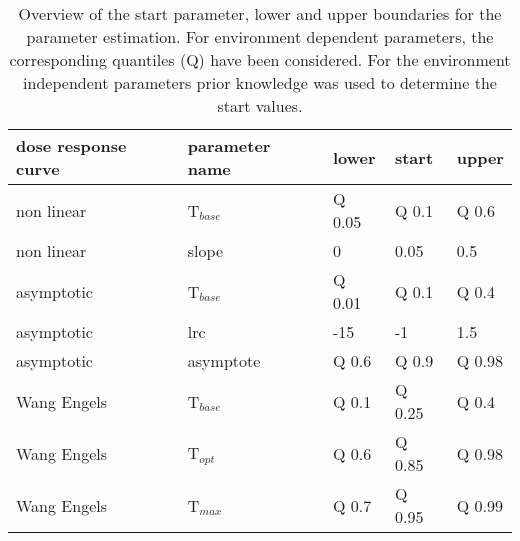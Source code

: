 \begin{table}[h]
\centering
\caption{Overview of the start parameter, lower and upper boundaries for the parameter estimation. For environment dependent parameters, the corresponding quantiles (Q) have been considered. For the environment independent parameters prior knowledge was used to determine the start values. }
\label{tab:Sup_starting_paramters}

\begin{tabular}{lllll}
\toprule
dose response curve & parameter name & lower  & start  & upper  \\ \hline
non linear          & T$_{base}$     & Q 0.05 & Q 0.1  & Q 0.6  \\
non linear          & slope          & 0      & 0.05   & 0.5    \\
asymptotic          & T$_{base}$     & Q 0.01 & Q 0.1  & Q 0.4  \\
asymptotic          & lrc            & -15    & -1     & 1.5    \\
asymptotic          & asymptote      & Q 0.6      & Q 0.9   & Q 0.98   \\
Wang Engels         & T$_{base}$     & Q 0.1  & Q 0.25 & Q 0.4  \\
Wang Engels         & T$_{opt}$      & Q 0.6  & Q 0.85 & Q 0.98 \\
Wang Engels         & T$_{max}$      & Q 0.7  & Q 0.95 & Q 0.99 \\
\bottomrule
\end{tabular}
\end{table}